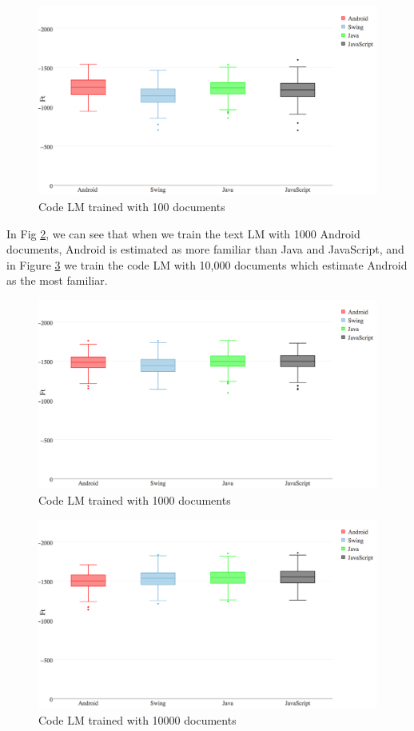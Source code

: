 \documentclass[12pt,mscthesis]{usiinfthesis}
\begin{document}
{\begin{figure}[H]
			\centering
			\includegraphics[width=\textwidth]{text100}
			\caption{Code LM trained with 100 documents}
			\label{text100}
\end{figure}

In Fig \ref{text1000}, we can see that when we train the text LM with 1000 Android documents, Android is estimated as more familiar than Java and JavaScript, and in Figure \ref{text10000} we train the code LM with 10,000 documents which estimate Android as the most familiar.

\begin{figure}[H]
			\centering
			\includegraphics[width=\textwidth]{text1000}
			\caption{Code LM trained with 1000 documents}
			\label{text1000}
\end{figure}

\begin{figure}[H]
			\centering
			\includegraphics[width=\textwidth]{text10000}
			\caption{Code LM trained with 10000 documents}
			\label{text10000}
\end{figure}

}
\end{document}
